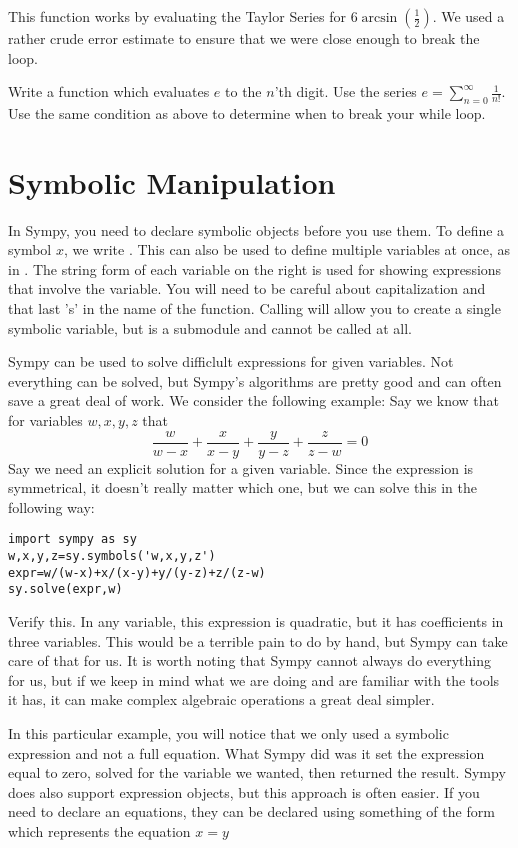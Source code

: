 This function works by evaluating the Taylor Series for $6\arcsin\left(\frac{1}{2}\right)$.
We used a rather crude error estimate to ensure that we were close enough to break the loop.

\begin{problem}
Write a function which evaluates $e$ to the $n$'th digit.
Use the series $\displaystyle{e=\sum_{n=0}^{\infty} \frac{1}{n!}}$.
Use the same condition as above to determine when to break your while loop.
\end{problem}

\section*{Symbolic Manipulation}
In Sympy, you need to declare symbolic objects before you use them.
To define a symbol $x$, we write .
This can also be used to define multiple variables at once, as in .
The string form of each variable on the right is used for showing expressions that involve the variable.
You will need to be careful about capitalization and that last 's' in the name of the function.
Calling  will allow you to create a single symbolic variable, but  is a submodule and cannot be called at all.

Sympy can be used to solve difficlult expressions for given variables.
Not everything can be solved, but Sympy's algorithms are pretty good and can often save a great deal of work.
We consider the following example:
Say we know that for variables $w,x,y,z$ that
$$\frac{w}{w-x}+\frac{x}{x-y}+\frac{y}{y-z}+\frac{z}{z-w}=0$$
Say we need an explicit solution for a given variable. 
Since the expression is symmetrical, it doesn't really matter which one, but we can solve this in the following way:
\begin{lstlisting}
import sympy as sy
w,x,y,z=sy.symbols('w,x,y,z')
expr=w/(w-x)+x/(x-y)+y/(y-z)+z/(z-w)
sy.solve(expr,w)
\end{lstlisting}
Verify this.
In any variable, this expression is quadratic, but it has coefficients in three variables.
This would be a terrible pain to do by hand, but Sympy can take care of that for us.
It is worth noting that Sympy cannot always do everything for us, but if we keep in mind what we are doing and are familiar with the tools it has, it can make complex algebraic operations a great deal simpler.

In this particular example, you will notice that we only used a symbolic expression and not a full equation.
What Sympy did was it set the expression equal to zero, solved for the variable we wanted, then returned the result.
Sympy does also support expression objects, but this approach is often easier.
If you need to declare an equations, they can be declared using something of the form  which represents the equation $x=y$

